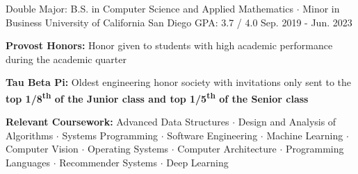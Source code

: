 

\begin{cventries}

  \cventry
    {Double Major: B.S. in Computer Science and Applied Mathematics $\cdot$ Minor in Business} %
    {University of California San Diego} %
    {GPA: 3.7 / 4.0} %
    {Sep. 2019 - Jun. 2023} %
    {
      \begin{cvitems} %
        \item {\textbf{Provost Honors:} Honor given to students with high academic performance during the academic quarter}
        \item {\textbf{Tau Beta Pi:} Oldest engineering honor society with invitations only sent to the \textbf{top 1/8\textsuperscript{th} of the Junior class and top 1/5\textsuperscript{th} of the Senior class}}
        \item {\textbf{Relevant Coursework:} Advanced Data Structures $\cdot$ Design and Analysis of Algorithms $\cdot$ Systems Programming $\cdot$ Software Engineering $\cdot$ Machine Learning $\cdot$ Computer Vision $\cdot$ Operating Systems $\cdot$ Computer Architecture $\cdot$ Programming Languages $\cdot$ Recommender Systems $\cdot$ Deep Learning}
      \end{cvitems}
    }

\end{cventries}
